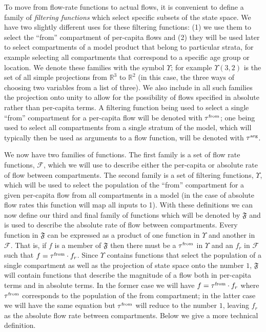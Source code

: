 \documentclass{article}
\theoremstyle{definition}
\newcommand{\R}{\mathbb{R}}%
\newcommand{\flowfuncnull}{\mathfrak{F}}
\newcommand{\fr}{\ensuremath{\mathcal F}}
\newcommand{\tauf}{\tau^{\mbox{\tiny from}}}
\newcommand{\taua}{\tau^{\mbox{\tiny arg}}}
\newcommand{\define}[1]{\emph{{#1}}}
\begin{document}
To move from flow-rate functions to actual flows, it is convenient to define a family of \define{filtering functions} which select specific subsets of the state space. We have two slightly different uses for these filtering functions: (1) we use them to select the ``from'' compartment of per-capita flows and (2) they will be used later to select compartments of a model product that belong to particular strata, for example selecting all compartments that correspond to a specific age group or location. We denote these families with the symbol $\Upsilon$; for example $\Upsilon(3,2)$ is the set of all simple projections from $\R^3$ to $\R^2$ (in this case, the three ways of choosing two variables from a list of three). We also include in all such families the projection onto unity to allow for the possibility of flows specified in absolute rather than per-capita terms. A filtering function being used to select a single ``from'' compartment for a per-capita flow will be denoted with $\tauf$; one being used to select all compartments from a single stratum of the model, which will typically then be used as arguments to a flow function, will be denoted with $\taua$.

We now have two families of functions. The first family is a set of flow rate functions, $\fr$, which we will use to describe either the per-capita or absolute rate of flow between compartments. The second family is a set of filtering functions, $\Upsilon$, which will be used to select the population of the ``from'' compartment for a given per-capita flow from all compartments in a model (in the case of absolute flow rates this function will map all inputs to 1). With these definitions we can now define our third and final family of functions which will be denoted by $\flowfuncnull$ and is used to describe the absolute rate of flow between compartments. Every function in $\flowfuncnull$ can be expressed as a product of one function in $\Upsilon$ and another in $\fr$. That is, if $f$ is a member of $\flowfuncnull$ then there must be a $\tauf$ in $\Upsilon$ and an $f_r$ in $\fr$ such that $f = \tauf \cdot f_r$. Since $\Upsilon$ contains functions that select the population of a single compartment as well as the projection of state space onto the number $1$, $\flowfuncnull$ will contain functions that describe the magnitude of a flow both in per-capita terms and in absolute terms. In the former case we will have $f = \tauf\cdot f_r$ where $\tauf$ corresponds to the population of the from compartment;  in the latter case we will have the same equation but $\tauf$ will reduce to the number $1$, leaving $f_r$ as the absolute flow rate between compartments. Below we give a more technical definition.
\end{document}
